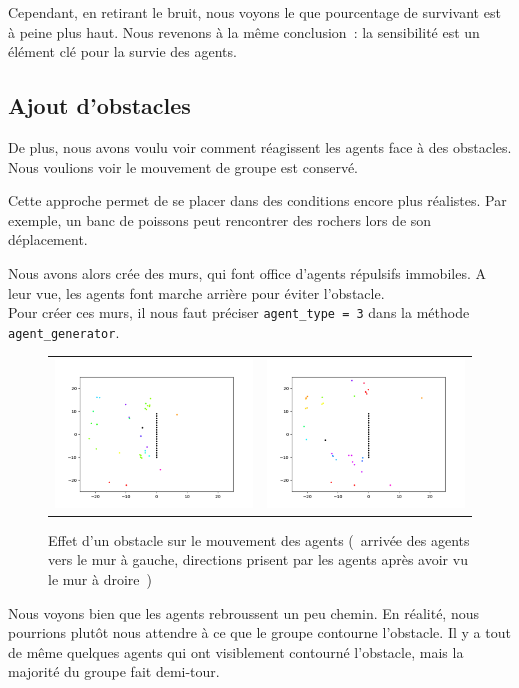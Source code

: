\documentclass[french, a4paper, 12pt, openany]{report}
\begin{document}
  Cependant, en retirant le bruit, nous voyons le que pourcentage de survivant est à peine plus haut. Nous revenons à la même conclusion~: la sensibilité est un élément clé pour la survie des agents.
  

\subsection{Ajout d'obstacles}

   De plus, nous avons voulu voir comment réagissent les agents face à des obstacles. Nous voulions voir le mouvement de groupe est conservé. 
   
   Cette approche permet de se placer dans des conditions encore plus réalistes. Par exemple, un banc de poissons peut rencontrer des rochers lors de son déplacement. 
   
   Nous avons alors crée des murs, qui font office d'agents répulsifs immobiles. A leur vue, les agents font marche arrière pour éviter l'obstacle. \\
   
   Pour créer ces murs, il nous faut préciser \verb|agent_type = 3| dans la méthode \verb|agent_generator|.\\
   
	\begin{figure}[!h]
		\centering
		\begin{tabular}{cc}
			\includegraphics[width=8cm]{images/image_19.png} & \includegraphics[width=8cm]{images/image_18.png} \\
		\end{tabular}
		\caption{Effet d'un obstacle sur le mouvement des agents (~arrivée des agents vers le mur à gauche, directions prisent par les agents après avoir vu le mur à droire~)}
		\label{obstacles}
	\end{figure}

	Nous voyons bien que les agents rebroussent un peu chemin. En réalité, nous pourrions plutôt nous attendre à ce que le groupe contourne l'obstacle. Il y a tout de même quelques agents qui ont visiblement contourné l'obstacle, mais la majorité du groupe fait demi-tour.
	
	
\end{document}
